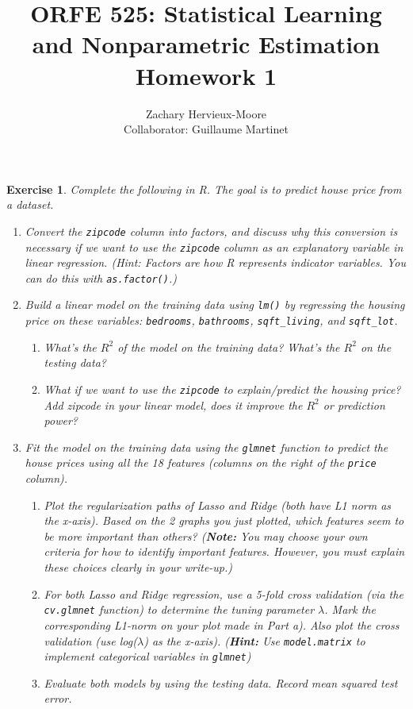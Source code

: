 \documentclass[12pt]{article}
\title{ORFE 525: Statistical Learning and Nonparametric Estimation \\ Homework 1}
\author{Zachary Hervieux-Moore \\ Collaborator: Guillaume Martinet}
\date{\displaydate{date}}
\theoremstyle{colon}
\newtheorem{exercise}{Exercise}
\begin{document}
\maketitle

\clearpage

\begin{exercise}
  Complete the following in R. The goal is to predict house price from a dataset.
  \begin{enumerate}[label=\arabic*)]
    \item Convert the \texttt{zipcode} column into factors, and discuss why this conversion is necessary if we want to use the \texttt{zipcode} column as an explanatory variable in linear regression.
      (Hint: Factors are how R represents indicator variables. You can do this with \texttt{as.factor()}.)

    \item Build a linear model on the training data using \texttt{lm()} by regressing the housing price on these variables: \texttt{bedrooms}, \texttt{bathrooms}, \texttt{sqft\_living}, and \texttt{sqft\_lot}.
      \begin{enumerate}[label=\alph*)]
        \item What's the $R^2$ of the model on the training data? What's the $R^2$ on the testing data?
        \item What if we want to use the \texttt{zipcode} to explain/predict the housing price? Add zipcode in your linear model, does it improve the $R^2$ or prediction power?
      \end{enumerate}

    \item Fit the model on the training data using the \texttt{glmnet} function to predict the house prices using all the 18 features (columns on the right of the \texttt{price} column).
      \begin{enumerate}[label=\alph*)]
        \item Plot the regularization paths of Lasso and Ridge (both have L1 norm as the x-axis). Based on the 2 graphs you just plotted, which features seem to be more important than others?
          (\textbf{Note:} You may choose your own criteria for how to identify important features. However, you must explain these choices clearly in your write-up.)
        \item For both Lasso and Ridge regression, use a 5-fold cross validation (via the \texttt{cv.glmnet} function) to determine the tuning parameter $\lambda$. Mark the corresponding L1-norm on your plot made in Part a). Also plot the cross validation (use log($\lambda$) as the x-axis). (\textbf{Hint:} Use \texttt{model.matrix} to implement categorical variables in \texttt{glmnet})
        \item Evaluate both models by using the testing data. Record mean squared test error.
      \end{enumerate}


\end{enumerate}
\end{exercise}
\end{document}
